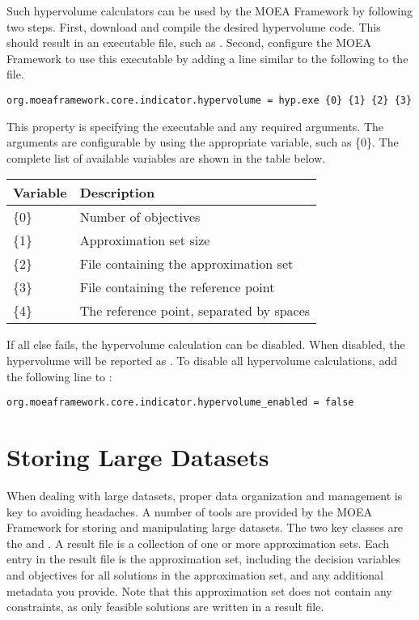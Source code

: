 Such hypervolume calculators can be used by the MOEA Framework by following two steps.  First, download and compile the desired hypervolume code.  This should result in an executable file, such as .  Second, configure the MOEA Framework to use this executable by adding a line similar to the following to the  file.

\begin{lstlisting}[language=Plaintext]
org.moeaframework.core.indicator.hypervolume = hyp.exe {0} {1} {2} {3}
\end{lstlisting}

This property is specifying the executable and any required arguments.  The arguments are configurable by using the appropriate variable, such as \{0\}.  The complete list of available variables are shown in the table below.

\begin{center}
\begin{tabular}{ll}
  Variable & Description \\
  \hline
  \{0\} & Number of objectives \\
  \{1\} & Approximation set size \\
  \{2\} & File containing the approximation set \\
  \{3\} & File containing the reference point \\
  \{4\} & The reference point, separated by spaces
\end{tabular}
\end{center}

If all else fails, the hypervolume calculation can be disabled.  When disabled, the hypervolume will be reported as .  To disable all hypervolume calculations, add the following line to :

\begin{lstlisting}[language=Plaintext]
org.moeaframework.core.indicator.hypervolume_enabled = false
\end{lstlisting}

\section{Storing Large Datasets}
When dealing with large datasets, proper data organization and management is key to avoiding headaches.  A number of tools are provided by the MOEA Framework for storing and manipulating large datasets.  The two key classes are the  and .  A result file is a collection of one or more approximation sets.  Each entry in the result file is the approximation set, including the decision variables and objectives for all solutions in the approximation set, and any additional metadata you provide.  Note that this approximation set does not contain any constraints, as only feasible solutions are written in a result file.

